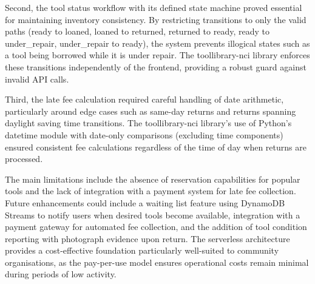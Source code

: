 \documentclass[conference]{IEEEtran}
\begin{document}
Second, the tool status workflow with its defined state machine proved essential for maintaining inventory consistency. By restricting transitions to only the valid paths (ready to loaned, loaned to returned, returned to ready, ready to under\_repair, under\_repair to ready), the system prevents illogical states such as a tool being borrowed while it is under repair. The toollibrary-nci library enforces these transitions independently of the frontend, providing a robust guard against invalid API calls.

Third, the late fee calculation required careful handling of date arithmetic, particularly around edge cases such as same-day returns and returns spanning daylight saving time transitions. The toollibrary-nci library's use of Python's datetime module with date-only comparisons (excluding time components) ensured consistent fee calculations regardless of the time of day when returns are processed.

The main limitations include the absence of reservation capabilities for popular tools and the lack of integration with a payment system for late fee collection. Future enhancements could include a waiting list feature using DynamoDB Streams to notify users when desired tools become available, integration with a payment gateway for automated fee collection, and the addition of tool condition reporting with photograph evidence upon return. The serverless architecture provides a cost-effective foundation particularly well-suited to community organisations, as the pay-per-use model ensures operational costs remain minimal during periods of low activity.
\end{document}
